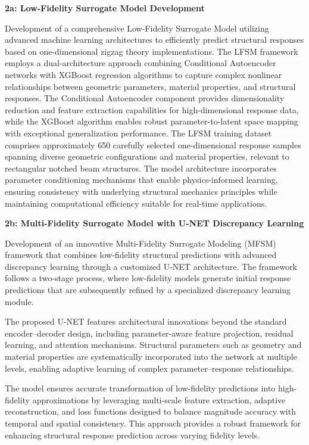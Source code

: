 \documentclass[12pt,a4paper]{report}
\begin{document}
\textbf{2a: Low-Fidelity Surrogate Model Development}

\medskip

Development of a comprehensive Low-Fidelity Surrogate Model utilizing advanced machine learning architectures to efficiently predict structural responses based on one-dimensional zigzag theory implementations. The LFSM framework employs a dual-architecture approach combining Conditional Autoencoder networks with XGBoost regression algorithms to capture complex nonlinear relationships between geometric parameters, material properties, and structural responses. The Conditional Autoencoder component provides dimensionality reduction and feature extraction capabilities for high-dimensional response data, while the XGBoost algorithm enables robust parameter-to-latent space mapping with exceptional generalization performance. The LFSM training dataset comprises approximately 650 carefully selected one-dimensional response samples spanning diverse geometric configurations and  material properties, relevant to rectangular notched beam structures. The model architecture incorporates parameter conditioning mechanisms that enable physics-informed learning, ensuring consistency with underlying structural mechanics principles while maintaining computational efficiency suitable for real-time applications.

\bigskip

\textbf{2b: Multi-Fidelity Surrogate Model with U-NET Discrepancy Learning}

\medskip

Development of an innovative Multi-Fidelity Surrogate Modeling (MFSM) framework that combines low-fidelity structural predictions with advanced discrepancy learning through a customized U-NET architecture. The framework follows a two-stage process, where low-fidelity models generate initial response predictions that are subsequently refined by a specialized discrepancy learning module.

The proposed U-NET features architectural innovations beyond the standard encoder–decoder design, including parameter-aware feature projection, residual learning, and attention mechanisms. Structural parameters such as geometry and material properties are systematically incorporated into the network at multiple levels, enabling adaptive learning of complex parameter–response relationships.

The model ensures accurate transformation of low-fidelity predictions into high-fidelity approximations by leveraging multi-scale feature extraction, adaptive reconstruction, and loss functions designed to balance magnitude accuracy with temporal and spatial consistency. This approach provides a robust framework for enhancing structural response prediction across varying fidelity levels.
\end{document}
